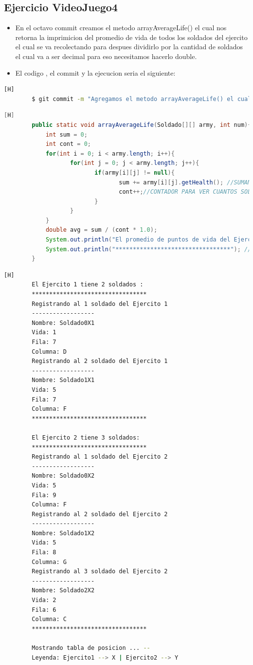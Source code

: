 \documentclass{article}
\begin{document}
	\subsection{Ejercicio VideoJuego4}
	\begin{itemize}	
		\item En el octavo commit creamos el metodo arrayAverageLife() el cual nos retorna la imprimicion del promedio de vida de todos los soldados del ejercito el cual se va recolectando para despues dividirlo por la cantidad de soldados el cual va a ser decimal para eso necesitamos hacerlo double.
		\item El codigo , el commit y la ejecucion seria el siguiente:
	\end{itemize}	
	\begin{lstlisting}[language=bash,caption={Commit}][H]
		$ git commit -m "Agregamos el metodo arrayAverageLife() el cual nos dara el promedio de vida del ejercito el cual recolecteria la vida de todos y despues se dividiria en la cantidad de soldados el cual lo multiplicamos por 1.0 para que este sea double decimal y sea mas especifico y despues se imprimiria este resultadon"
	\end{lstlisting}	
	\begin{lstlisting}[language=java,caption={Las lineas de codigos del metodo creado:}][H]
		public static void arrayAverageLife(Soldado[][] army, int num){
			int sum = 0;
			int cont = 0;
			for(int i = 0; i < army.length; i++){
				   for(int j = 0; j < army.length; j++){
						  if(army[i][j] != null){
								 sum += army[i][j].getHealth(); //SUMAMOS LA VIDA DE LOS SOLDADOS DEL EJERCITO 2 
								 cont++;//CONTADOR PARA VER CUANTOS SOLDADOS EXISTEN EN ESTE EJERCITO PARA DESPUES PODER DIVIDIRLO CON SU SUMA
						  }
				   }
			}
			double avg = sum / (cont * 1.0);
			System.out.println("El promedio de puntos de vida del Ejercito " + num + " es: " + "\n" + avg);
			System.out.println("*********************************"); // AGREGANDOLO PARA HACER EL SIGUIENTE METODO Y SEPARARLOS
	   	}
	\end{lstlisting}
	\begin{lstlisting}[language=bash,caption={Ejecucion:}][H]
		El Ejercito 1 tiene 2 soldados : 
		*********************************
		Registrando al 1 soldado del Ejercito 1
		------------------
		Nombre: Soldado0X1
		Vida: 1
		Fila: 7
		Columna: D
		Registrando al 2 soldado del Ejercito 1
		------------------
		Nombre: Soldado1X1
		Vida: 5
		Fila: 7
		Columna: F
		*********************************
		
		El Ejercito 2 tiene 3 soldados:
		*********************************
		Registrando al 1 soldado del Ejercito 2
		------------------
		Nombre: Soldado0X2
		Vida: 5
		Fila: 9
		Columna: F
		Registrando al 2 soldado del Ejercito 2
		------------------
		Nombre: Soldado1X2
		Vida: 5
		Fila: 8
		Columna: G
		Registrando al 3 soldado del Ejercito 2
		------------------
		Nombre: Soldado2X2
		Vida: 2
		Fila: 6
		Columna: C
		*********************************
		
		Mostrando tabla de posicion ... --
		Leyenda: Ejercito1 --> X | Ejercito2 --> Y
				

	\end{lstlisting}
\end{document}
